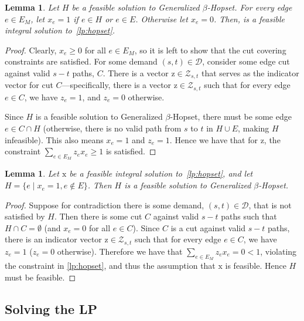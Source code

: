 \documentclass{article}
\newtheorem{lemma}[theorem]{Lemma}
\theoremstyle{definition}
\theoremstyle{remark}
\def\hopset {{\sc Generalized $\beta$-Hopset}}
\begin{document}
\iflong
\begin{lemma}
    Let $H$ be a feasible solution to {\hopset}. For every edge $e \in E_M$, let $x_e = 1$ if $e \in H$ or $e \in E$. Otherwise let $x_e = 0$. Then,  is a feasible integral solution to~\ref{lp:hopset}.
\end{lemma}
\begin{proof}
    Clearly, $x_e \geq 0$ for all $e \in E_M$, so it is left to show that the cut covering constraints are satisfied. For some demand $(s,t) \in \mathcal{D}$, consider some edge cut against valid $s-t$ paths, $C$. There is a vector $\bm{\mathrm{z}} \in \mathcal{Z}_{s,t}$ that serves as the indicator vector for cut $C$---specifically, there is a vector $\bm{\mathrm{z}} \in \mathcal{Z}_{s,t}$ such that for every edge $e \in C$, we have $z_e = 1$, and $z_e = 0$ otherwise. 
    
    Since $H$ is a feasible solution to {\hopset}, there must be some edge $e \in C \cap H$ (otherwise, there is no valid path from $s$ to $t$ in $H \cup E$, making $H$ infeasible). This also means $x_e = 1$ and  $z_e = 1$. Hence we have that for $\bm{\mathrm{z}}$, the constraint $\sum_{e \in E_M} z_e x_e \geq 1$ is satisfied.
\end{proof}

\begin{lemma}
    Let $\bm{\mathrm{x}}$ be a feasible integral solution to~\ref{lp:hopset}, and let $H = \{ e \; | \; x_e = 1, e \notin E\}$. Then $H$ is a feasible solution to {\hopset}.
\end{lemma}
\begin{proof}
    Suppose for contradiction there is some demand, $(s,t) \in \mathcal{D}$, that is not satisfied by $H$.  Then there is some cut $C$ against valid $s-t$ paths such that $H \cap C = \emptyset$ (and $x_e = 0$ for all $e \in C$). Since $C$ is a cut against valid $s-t$ paths, there is an indicator vector $\bm{\mathrm{z}} \in \mathcal{Z}_{s,t}$ such that for every edge $e \in C$, we have $z_e = 1$ ($z_e = 0$ otherwise). Therefore we have that $\sum_{e \in E_M} z_e x_e = 0 < 1$, violating the constraint in \ref{lp:hopset}, and thus the assumption that $\bm{\mathrm{x}}$ is feasible. Hence $H$ must be feasible.
\end{proof}
\fi



 
\subsection{Solving the LP}
\end{document}
